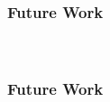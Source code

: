 
\begin{frame}[t]
	\frametitle{Future Work}
	\framesubtitle{~~}  %

\end{frame}
\begin{frame}[t]
	\frametitle{Future Work}
	\framesubtitle{~~}  %

\end{frame}


